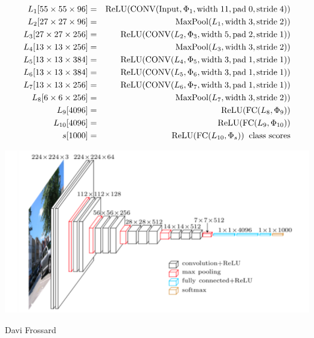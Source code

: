 {{\begin{eqnarray*}
L_1[55 \times 55 \times 96] & = & \mathrm{ReLU}(\mathrm{CONV}(\mathrm{Input},\Phi_1,\mathrm{width}\;11,\mathrm{pad}\;0,\mathrm{stride}\;4)) \\
L_2[27 \times 27 \times 96] & = & \mathrm{MaxPool}(L_1,\mathrm{width}\;3,\mathrm{stride}\;2))  \\
L_3[27 \times 27 \times 256] & = & \mathrm{ReLU}(\mathrm{CONV}(L_2,\Phi_3,\mathrm{width}\;5,\mathrm{pad}\;2,\mathrm{stride}\;1))  \\
L_4[13 \times 13 \times 256] & = & \mathrm{MaxPool}(L_3,\mathrm{width}\;3,\mathrm{stride}\;2))  \\
L_5[13 \times 13 \times 384] & = & \mathrm{ReLU}(\mathrm{CONV}(L_4,\Phi_5,\mathrm{width}\;3,\mathrm{pad}\;1,\mathrm{stride}\;1))  \\
L_6[13 \times 13 \times 384] & = & \mathrm{ReLU}(\mathrm{CONV}(L_5,\Phi_6,\mathrm{width}\;3,\mathrm{pad}\;1,\mathrm{stride}\;1))  \\
L_7[13 \times 13 \times 256] & = & \mathrm{ReLU}(\mathrm{CONV}(L_6,\Phi_7,\mathrm{width}\;3,\mathrm{pad}\;1,\mathrm{stride}\;1))  \\
L_8[6 \times 6 \times 256] & = & \mathrm{MaxPool}(L_7,\mathrm{width}\;3,\mathrm{stride}\;2)) \\
L_9[4096] & = & \mathrm{ReLU}(\mathrm{FC}(L_8,\Phi_9)) \\
L_{10}[4096] & = & \mathrm{ReLU}(\mathrm{FC}(L_9,\Phi_{10})) \\
s[1000] & = & \mathrm{ReLU}(\mathrm{FC}(L_{10},\Phi_s)) \;\;\mbox{class scores}
\end{eqnarray*}
}


\centerline{\includegraphics[width = 9.0in]{../images/VGG}}
\centerline{\large Davi Frossard}

}
